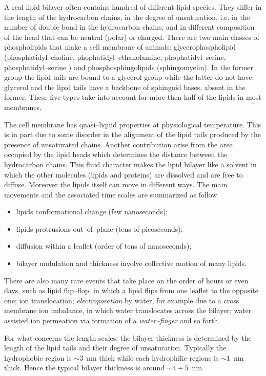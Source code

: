 A real lipid bilayer often contains hundred of different lipid species. They differ in the length of the 
hydrocarbon chains, in the degree of unsaturation, i.e. in the number of double bond in the hydrocarbon chains, 
and in different composition of the head that can be neutral (polar) or charged. There are two main classes of 
phospholipids that make a cell membrane of animals: glycerophospholipid (phosphatidyl--choline, 
phophatidyl--ethanolamine, phophatidyl--serine, phosphatidyl--serine ) and phosphosphingolipids (sphingomyelin). 
In the former group the lipid tails are bound to a glycerol group while the latter do not have glycerol and the 
lipid tails have a backbone of sphingoid bases, absent in the former. These five types take into account for more 
then half of the lipids in most membranes.

The cell membrane has quasi--liquid properties at physiological temperature. This is in part due to some disorder 
in the alignment of the lipid tails produced by the presence of unsaturated chains. Another contribution arise 
from the area occupied by the lipid heads which determines the distance between the hydrocarbon chains. This 
fluid character makes the lipid bilayer like a solvent in which the other molecules (lipids and proteins) are 
dissolved and are free to diffuse. Moreover the lipids itself can move in different ways. The main movements and 
the associated time scales are summarized as follow
\begin{itemize}
	\item lipids conformational change (few nanoseconds);
	\item lipids protrusions out--of--plane (tens of picoseconds);
	\item diffusion within a leaflet (order of tens of nanoseconds);
	\item bilayer undulation and thickness involve collective motion of many lipids.
\end{itemize}
There are also many rare events that take place on the order of hours or even days, such as lipid flip--flop, in 
which a lipid flips from one leaflet to the opposite one; ion translocation; \textit{electroporation} by water, 
for example due to a cross membrane ion imbalance, in which water translocates across the bilayer; water assisted 
ion permeation via formation of a \textit{water--finger} and so forth.

For what concerns the length scales, the bilayer thickness is determined by the length of the lipid tails and 
their degree of unsaturation. Typically the hydrophobic region is $\sim 3$~nm thick while each hydrophilic 
regions is $\sim 1$~nm thick. Hence the typical bilayer thickness is around $\sim 4\div 5$~nm.

